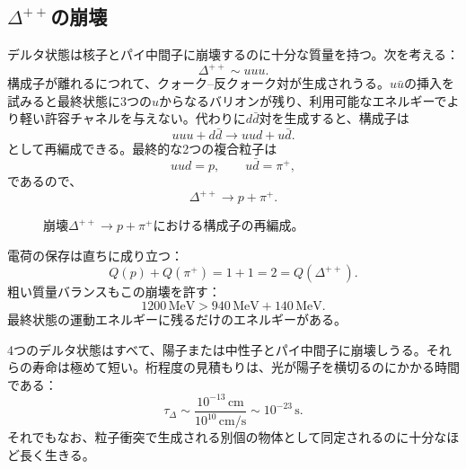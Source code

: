 \subsection{\texorpdfstring{\(\Delta^{++}\)}{Delta++}の崩壊}

デルタ状態は核子とパイ中間子に崩壊するのに十分な質量を持つ。次を考える：
\begin{equation}
\Delta^{++}\sim uuu.
\end{equation}
構成子が離れるにつれて、クォーク--反クォーク対が生成されうる。\(u\bar u\)の挿入を試みると最終状態に3つの\(u\)からなるバリオンが残り、利用可能なエネルギーでより軽い許容チャネルを与えない。代わりに\(d\bar d\)対を生成すると、構成子は
\begin{equation}
uuu+d\bar d
\longrightarrow
uud+u\bar d.
\end{equation}
として再編成できる。最終的な2つの複合粒子は
\begin{equation}
uud=p,
\qquad
u\bar d=\pi^+,
\end{equation}
であるので、
\begin{equation}
\Delta^{++}\longrightarrow p+\pi^+.
\end{equation}

\begin{figure}[h]
\centering
{}
\caption{崩壊\(\Delta^{++}\rightarrow p+\pi^+\)における構成子の再編成。}
\end{figure}

電荷の保存は直ちに成り立つ：
\begin{equation}
Q(p)+Q(\pi^+)=1+1=2=Q(\Delta^{++}).
\end{equation}
粗い質量バランスもこの崩壊を許す：
\begin{equation}
1200\,\mathrm{MeV}
>
940\,\mathrm{MeV}+140\,\mathrm{MeV}.
\end{equation}
最終状態の運動エネルギーに残るだけのエネルギーがある。

4つのデルタ状態はすべて、陽子または中性子とパイ中間子に崩壊しうる。それらの寿命は極めて短い。桁程度の見積もりは、光が陽子を横切るのにかかる時間である：
\begin{equation}
\tau_\Delta
\sim
\frac{10^{-13}\,\mathrm{cm}}
     {10^{10}\,\mathrm{cm/s}}
\sim10^{-23}\,\mathrm{s}.
\end{equation}
それでもなお、粒子衝突で生成される別個の物体として同定されるのに十分なほど長く生きる。

